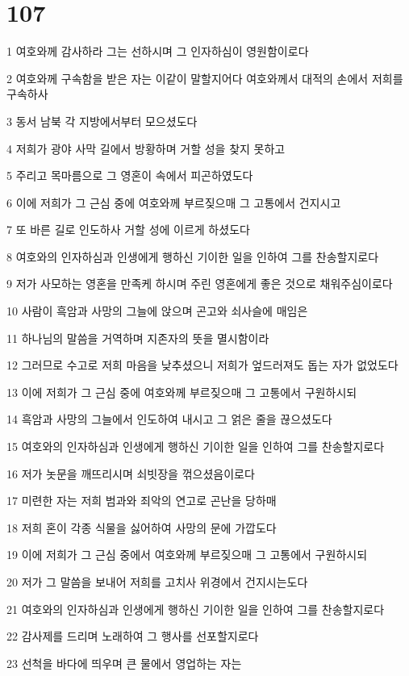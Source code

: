 \chapter{107}

\par 1 여호와께 감사하라 그는 선하시며 그 인자하심이 영원함이로다
\par 2 여호와께 구속함을 받은 자는 이같이 말할지어다 여호와께서 대적의 손에서 저희를 구속하사
\par 3 동서 남북 각 지방에서부터 모으셨도다
\par 4 저희가 광야 사막 길에서 방황하며 거할 성을 찾지 못하고
\par 5 주리고 목마름으로 그 영혼이 속에서 피곤하였도다
\par 6 이에 저희가 그 근심 중에 여호와께 부르짖으매 그 고통에서 건지시고
\par 7 또 바른 길로 인도하사 거할 성에 이르게 하셨도다
\par 8 여호와의 인자하심과 인생에게 행하신 기이한 일을 인하여 그를 찬송할지로다
\par 9 저가 사모하는 영혼을 만족케 하시며 주린 영혼에게 좋은 것으로 채워주심이로다
\par 10 사람이 흑암과 사망의 그늘에 앉으며 곤고와 쇠사슬에 매임은
\par 11 하나님의 말씀을 거역하며 지존자의 뜻을 멸시함이라
\par 12 그러므로 수고로 저희 마음을 낮추셨으니 저희가 엎드러져도 돕는 자가 없었도다
\par 13 이에 저희가 그 근심 중에 여호와께 부르짖으매 그 고통에서 구원하시되
\par 14 흑암과 사망의 그늘에서 인도하여 내시고 그 얽은 줄을 끊으셨도다
\par 15 여호와의 인자하심과 인생에게 행하신 기이한 일을 인하여 그를 찬송할지로다
\par 16 저가 놋문을 깨뜨리시며 쇠빗장을 꺾으셨음이로다
\par 17 미련한 자는 저희 범과와 죄악의 연고로 곤난을 당하매
\par 18 저희 혼이 각종 식물을 싫어하여 사망의 문에 가깝도다
\par 19 이에 저희가 그 근심 중에서 여호와께 부르짖으매 그 고통에서 구원하시되
\par 20 저가 그 말씀을 보내어 저희를 고치사 위경에서 건지시는도다
\par 21 여호와의 인자하심과 인생에게 행하신 기이한 일을 인하여 그를 찬송할지로다
\par 22 감사제를 드리며 노래하여 그 행사를 선포할지로다
\par 23 선척을 바다에 띄우며 큰 물에서 영업하는 자는
